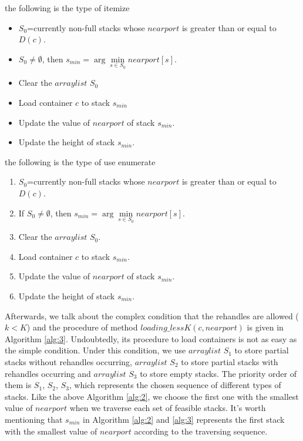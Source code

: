 \documentclass[review,3p,times,authoryear,12pt]{elsarticle}
\begin{document}
 the following is the type of itemize
 
\begin{itemize}
\item $S_0$=currently non-full stacks whose $nearport$ is greater than or equal to $D(c)$.
\item \If $S_0 \neq \emptyset$, then $s_{min}=\arg\min \limits_{s\in S_0} nearport[s]$.
\item Clear the $arraylist$ $S_0$
\item Load container $c$ to stack $s_{min}$
\item Update the value of $nearport$ of stack $s_{min}$.
\item Update the height of stack $s_{min}$.
\end{itemize}

 the following is the type of use enumerate
 
\begin{enumerate}[step 1]
\item $S_0$=currently non-full stacks whose $nearport$ is greater than or equal to $D(c)$.
\item If $S_0 \neq \emptyset$, then $s_{min}=\arg\min \limits_{s\in S_0} nearport[s]$.
\item Clear the $arraylist$ $S_0$.
\item Load container $c$ to stack $s_{min}$.
\item Update the value of $nearport$ of stack $s_{min}$.
\item Update the height of stack $s_{min}$.
\end{enumerate}



Afterwards, we talk about the complex condition that the rehandles are allowed ($k<K$) and the procedure of method $loading\_lessK(c,nearport)$ is given in Algorithm \ref{alg:3}.
Undoubtedly, its procedure to load containers is not as easy as the simple condition.
Under this condition, we use $arraylist$ $S_1$ to store partial stacks without rehandles occurring, $arraylist$ $S_2$ to store partial stacks with rehandles occurring and $arraylist$ $S_3$ to store empty stacks.
The priority order of them is $S_1$, $S_2$, $S_3$, which represents the chosen sequence of different types of stacks.
Like the above Algorithm \ref{alg:2}, we choose the first one with the smallest value of $nearport$ when we traverse each set of feasible stacks.
It's worth mentioning that $s_{min}$ in Algorithm \ref{alg:2} and \ref{alg:3} represents the first stack with the smallest value of $nearport$ according to the traversing sequence.
\end{document}
